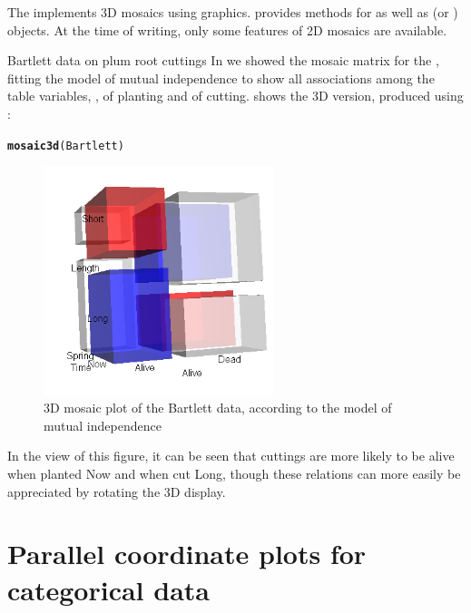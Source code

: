 \documentclass[11pt]{book}\usepackage[]{graphicx}\usepackage[]{color}
\makeatletter
\newcommand{\hlstd}[1]{\textcolor[rgb]{0.345,0.345,0.345}{#1}}%
\newcommand{\hlkwd}[1]{\textcolor[rgb]{0.737,0.353,0.396}{\textbf{#1}}}%
\newenvironment{kframe}{%
 \def\at@end@of@kframe{}%
 \ifinner\ifhmode%
  \def\at@end@of@kframe{\end{minipage}}%
  \begin{minipage}{\columnwidth}%
 \fi\fi%
 \def\FrameCommand##1{\hskip\@totalleftmargin \hskip-\fboxsep
 \colorbox{shadecolor}{##1}\hskip-\fboxsep
     \hskip-\linewidth \hskip-\@totalleftmargin \hskip\columnwidth}%
 \MakeFramed {\advance\hsize-\width
   \@totalleftmargin\z@ \linewidth\hsize
   \@setminipage}}%
 {\par\unskip\endMakeFramed%
 \at@end@of@kframe}
\newenvironment{knitrout}{}{} %
\renewenvironment{knitrout}{\small\renewcommand{\baselinestretch}{.85}}{} %
\makeatother
\begin{document}
The  implements 3D mosaics using  graphics.
 provides methods for 
as well as  (or ) objects.
At the time of writing, only some features of 2D mosaics are available.

\begin{Example}[bartlett-3d]{Bartlett data on plum root cuttings}
In  we showed the mosaic matrix for the
, fitting the model of mutual independence
to show all associations among the table variables,
,  of planting and  of cutting.
 shows the 3D version, produced using
:
\begin{knitrout}
\color{fgcolor}\begin{kframe}
\begin{alltt}
\hlkwd{mosaic3d}\hlstd{(Bartlett)}
\end{alltt}
\end{kframe}
\end{knitrout}


\begin{figure}[!htb]
 \centering
 \includegraphics[width=0.6\textwidth]{ch05/fig/mos3d-bartlett.png}
 \caption{3D mosaic plot of the Bartlett data, according to the model of mutual independence}\label{fig:mos3d-bartlett}
\end{figure}

In the view of this figure, it can be seen that cuttings are more likely to be alive
when planted Now and when cut Long, though these relations can more easily be
appreciated by rotating the 3D display.
\end{Example}


\section{Parallel coordinate plots for categorical data}\label{sec:parallel}
\end{document}

